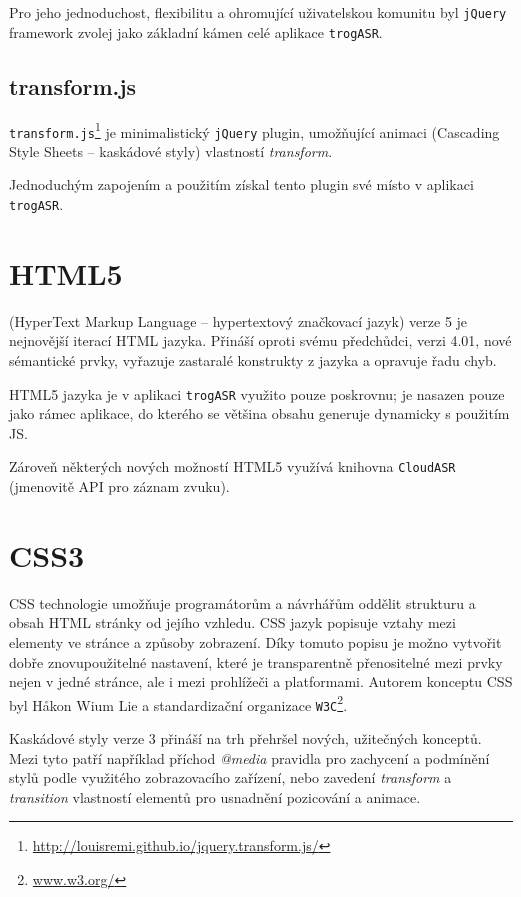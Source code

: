 Pro jeho jednoduchost, flexibilitu a ohromující uživatelskou komunitu byl \verb|jQuery| framework zvolej jako základní kámen celé aplikace \verb|trogASR|.

\subsection{transform.js}

\verb|transform.js|\footnote{\url{http://louisremi.github.io/jquery.transform.js/}} je minimalistický \verb|jQuery| plugin, umožňující animaci  (Cascading Style Sheets -- kaskádové styly) vlastností {\sl transform}.

Jednoduchým zapojením a použitím získal tento plugin své místo v aplikaci \verb|trogASR|.

\section{HTML5}

 (HyperText Markup Language -- hypertextový značkovací jazyk) verze 5 je nejnovější iterací HTML jazyka. Přináší oproti svému předchůdci, verzi 4.01, nové sémantické prvky, vyřazuje zastaralé konstrukty z jazyka a opravuje řadu chyb.

HTML5 jazyka je v aplikaci \verb|trogASR| využito pouze poskrovnu; je nasazen pouze jako rámec aplikace, do kterého se většina obsahu generuje dynamicky s použitím JS.

Zároveň některých nových možností HTML5 využívá knihovna \verb|CloudASR| (jmenovitě API pro záznam zvuku).

\section{CSS3}

CSS technologie umožňuje programátorům a návrhářům oddělit strukturu a obsah HTML stránky od jejího vzhledu. CSS jazyk popisuje vztahy mezi elementy ve stránce a způsoby zobrazení. Díky tomuto popisu je možno vytvořit dobře znovupoužitelné nastavení, které je transparentně přenositelné mezi prvky nejen v jedné stránce, ale i mezi prohlížeči a platformami. Autorem konceptu CSS byl Håkon Wium Lie a standardizační organizace \verb|W3C|\footnote{\url{www.w3.org/}}.

Kaskádové styly verze 3 přináší na trh přehršel nových, užitečných konceptů. Mezi tyto patří například příchod {\sl @media} pravidla pro zachycení a podmínění stylů podle využitého zobrazovacího zařízení, nebo zavedení {\sl transform} a {\sl transition} vlastností elementů pro usnadnění pozicování a animace.

